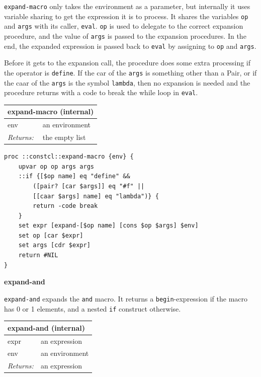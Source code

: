 \documentclass[twoside,9pt]{report}
\begin{document}
\texttt{expand-macro} only takes the environment as a parameter, but internally it uses variable sharing to get the expression it is to process. It shares the variables \texttt{op} and \texttt{args} with its caller, \texttt{eval}. \texttt{op} is used to delegate to the correct expansion procedure, and the value of \texttt{args} is passed to the expansion procedures. In the end, the expanded expression is passed back to \texttt{eval} by assigning to \texttt{op} and \texttt{args}.


Before it gets to the expansion call, the procedure does some extra processing if the operator is \texttt{define}. If the car of the \texttt{args} is something other than a Pair, or if the caar of the \texttt{args} is the symbol \texttt{lambda}, then no expansion is needed and the procedure returns with a code to break the while loop in \texttt{eval}.

\begin{tabular}{ |l l| }
\hline
\multicolumn{2}{|l|}{expand-macro (internal)} \\
\hline
env & an environment \\
\textit{Returns:} & the empty list \\
\hline
\end{tabular}

\noindent\makebox[\linewidth]{\rule{\linewidth}{0.4pt}}
\begin{lstlisting}
proc ::constcl::expand-macro {env} {
    upvar op op args args
    ::if {[$op name] eq "define" &&
        ([pair? [car $args]] eq "#f" ||
        [[caar $args] name] eq "lambda")} {
        return -code break
    }
    set expr [expand-[$op name] [cons $op $args] $env]
    set op [car $expr]
    set args [cdr $expr]
    return #NIL
}
\end{lstlisting}
\noindent\makebox[\linewidth]{\rule{\linewidth}{0.4pt}}

\textbf{expand-and}


\texttt{expand-and} expands the \texttt{and} macro. It returns a \texttt{begin}-expression if the macro has 0 or 1 elements, and a nested \texttt{if} construct otherwise.

\begin{tabular}{ |l l| }
\hline
\multicolumn{2}{|l|}{expand-and (internal)} \\
\hline
expr & an expression \\
env & an environment \\
\textit{Returns:} & an expression \\
\hline
\end{tabular}
\end{document}
